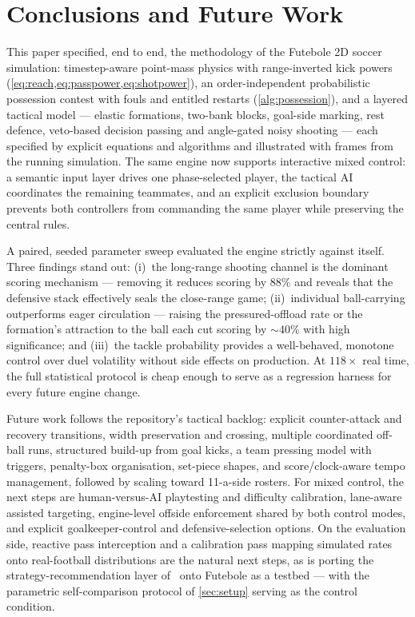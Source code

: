 \documentclass[10pt,twocolumn]{article}
\begin{document}
\section{Conclusions and Future Work}\label{sec:conclusion}

This paper specified, end to end, the methodology of the Futebole 2D
soccer simulation: timestep-aware point-mass physics with
range-inverted kick powers (\cref{eq:reach,eq:passpower,eq:shotpower}),
an order-independent probabilistic possession contest with fouls and
entitled restarts (\cref{alg:possession}), and a layered tactical model
--- elastic formations, two-bank blocks, goal-side marking, rest defence,
veto-based decision passing and angle-gated noisy shooting --- each
specified by explicit equations and algorithms and illustrated with frames
from the running simulation. The same engine now supports interactive
mixed control: a semantic input layer drives one phase-selected
player, the tactical AI coordinates the remaining teammates, and an explicit
exclusion boundary prevents both controllers from commanding the same
player while preserving the central rules.

A paired, seeded parameter sweep evaluated the engine strictly against
itself. Three findings stand out: (i)~the long-range shooting channel is
the dominant scoring mechanism --- removing it reduces scoring by 88\%
and reveals that the defensive stack effectively seals the close-range
game; (ii)~individual ball-carrying outperforms eager circulation ---
raising the pressured-offload rate or the formation's attraction to the
ball each cut scoring by $\sim$40\% with high significance; and (iii)~the
tackle probability provides a well-behaved, monotone control over duel
volatility without side effects on production. At $118\times$ real time,
the full statistical protocol is cheap enough to serve as a regression
harness for every future engine change.

Future work follows the repository's tactical backlog: explicit
counter-attack and recovery transitions, width preservation and crossing,
multiple coordinated off-ball runs, structured build-up from goal kicks, a
team pressing model with triggers, penalty-box organisation, set-piece
shapes, and score/clock-aware tempo management, followed by scaling toward
11-a-side rosters. For mixed control, the next steps are human-versus-AI
playtesting and difficulty calibration, lane-aware assisted targeting,
engine-level offside enforcement shared by both control modes, and explicit
goalkeeper-control and defensive-selection options. On the evaluation side,
reactive pass interception
and a calibration pass mapping simulated rates onto real-football
distributions are the natural next steps, as is porting the
strategy-recommendation layer of~\cite{abreu2014improving} onto Futebole
as a testbed --- with the parametric self-comparison protocol of
\cref{sec:setup} serving as the control condition.
\end{document}
